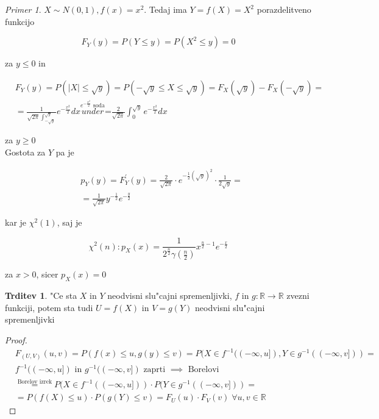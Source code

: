 \documentclass[a4paper,12pt]{article}
\theoremstyle{definition}
\newtheorem{claim}[counter]{Trditev}
\theoremstyle{remark}
\newtheorem*{ex}{Primer}
\newcommand{\R}{\mathbb{R}}
\begin{document}
\begin{ex}
    $X \sim N(0,1), f(x) = x^2$. Tedaj ima $Y = f(X) = X^2$ porazdelitveno funkcijo
    
    \begin{equation*}
        F_Y(y) = P(Y \leq y) = P(X^2 \leq y) = 0
    \end{equation*}

    za $y \leq 0$ in

    \begin{align*}
        &F_Y(y) = P(|X| \leq \sqrt{y}) = P(-\sqrt{y} \leq X \leq \sqrt{y}) = F_X(\sqrt{y}) - F_X(-\sqrt{y}) = \\
        &= \frac{1}{\sqrt{2\pi} \int_{-\sqrt{y}}^{\sqrt{y}}} e^{-\frac{x^2}{2}} dx
            \stackrel{e^{-\frac{x^2}{2}}\text{ soda}}{under}\text{=} \frac{2}{\sqrt{2\pi}}
            \int_{0}^{\sqrt{y}} e^{-\frac{x^2}{2}} dx
    \end{align*}

    za $y \geq 0$ \\
    Gostota za $Y$ pa je
    
    \begin{align*}
        &p_Y(y) = F_Y^{'}(y) = \frac{2}{\sqrt{2\pi}} \cdot e^{-\frac{1}{2}(\sqrt{y})^2} \cdot \frac{1}{2\sqrt{y}} = \\
        &= \frac{1}{\sqrt{2\pi}} y^{-\frac{1}{2}} e^{-\frac{y}{2}}
    \end{align*}

    kar je $\chi^2(1)$, saj je

    \begin{equation*}
        \chi^2(n): p_X(x) = \frac{1}{2^{\frac{n}{2}} \gamma(\frac{n}{2})} x^{\frac{n}{2} - 1} e^{-\frac{x}{2}}
    \end{equation*}

    za $x > 0$, sicer $p_X(x) = 0$
\end{ex}

\begin{claim}
    "Ce sta $X$ in $Y$ neodvisni slu"cajni spremenljivki, $f$ in $g: \R \to \R$ zvezni funkciji, potem sta tudi
    $U = f(X)$ in $V = g(Y)$ neodvisni slu"cajni spremenljivki
\end{claim}

\begin{proof}
    \begin{align*}
        &F_{(U,V)}(u,v) = P(f(x) \leq u, g(y) \leq v) = P(X \in f^{-1}((-\infty, u]), Y \in g^{-1}((-\infty, v])) =\\
        &f^{-1}((-\infty, u]) \text{ in } g^{-1}((-\infty, v]) \text{ zaprti } \implies \text{ Borelovi} \\
        &\stackrel{\text{Borelov izrek}}{=} P(X \in f^{-1}((-\infty, u])) \cdot P(Y \in g^{-1}((-\infty, v])) = \\
        &= P(f(X) \leq u) \cdot P(g(Y) \leq v) = F_U(u) \cdot F_V(v) \; \forall u, v \in \R
    \end{align*}
\end{proof}
\end{document}
